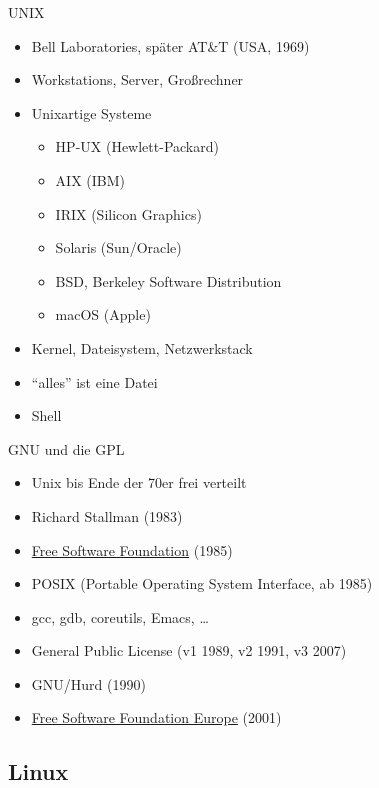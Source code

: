 \documentclass{beamer}
\begin{document}
\begin{frame}{UNIX}
    \begin{itemize}
        \item Bell Laboratories, später AT\&T (USA, 1969)
        \item Workstations, Server, Großrechner
        \item Unixartige Systeme
            \begin{itemize}
                \item HP-UX (Hewlett-Packard)
                \item AIX (IBM)
                \item IRIX (Silicon Graphics)
                \item Solaris (Sun/Oracle)
                \item BSD, Berkeley Software Distribution
                \item macOS (Apple)
            \end{itemize}
        \item Kernel, Dateisystem, Netzwerkstack
        \item \enquote{alles} ist eine Datei
        \item Shell
    \end{itemize}
\end{frame}

\begin{frame}{GNU und die GPL}
    \begin{itemize}
        \item Unix bis Ende der 70er frei verteilt
        \item Richard Stallman (1983)
        \item \href{https://www.fsf.org/}{Free Software Foundation} (1985)
        \item POSIX (Portable Operating System Interface, ab 1985)
        \item gcc, gdb, coreutils, Emacs, …
        \item General Public License (v1 1989, v2 1991, v3 2007)
        \item GNU/Hurd (1990)
        \item \href{https://fsfe.org/}{Free Software Foundation Europe} (2001)
    \end{itemize}
\end{frame}

\subsection{Linux}
\end{document}
